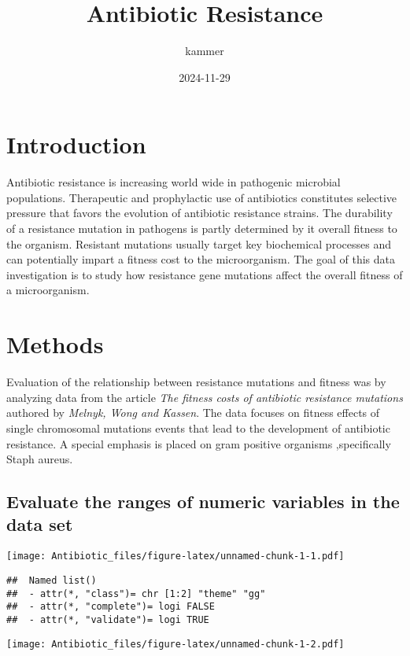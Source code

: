\documentclass[
]{article}
\title{Antibiotic Resistance}
\author{kammer}
\date{2024-11-29}
\begin{document}
\maketitle

\section{Introduction}\label{introduction}

Antibiotic resistance is increasing world wide in pathogenic microbial
populations. Therapeutic and prophylactic use of antibiotics constitutes
selective pressure that favors the evolution of antibiotic resistance
strains. The durability of a resistance mutation in pathogens is partly
determined by it overall fitness to the organism. Resistant mutations
usually target key biochemical processes and can potentially impart a
fitness cost to the microorganism. The goal of this data investigation
is to study how resistance gene mutations affect the overall fitness of
a microorganism.

\section{Methods}\label{methods}

Evaluation of the relationship between resistance mutations and fitness
was by analyzing data from the article \emph{The fitness costs of
antibiotic resistance mutations} authored by \emph{Melnyk, Wong and
Kassen}. The data focuses on fitness effects of single chromosomal
mutations events that lead to the development of antibiotic resistance.
A special emphasis is placed on gram positive organisms ,specifically
Staph aureus.

\subsection{Evaluate the ranges of numeric variables in the data
set}\label{evaluate-the-ranges-of-numeric-variables-in-the-data-set}

\texttt{[image: Antibiotic\_files/figure-latex/unnamed-chunk-1-1.pdf]}

\begin{verbatim}
##  Named list()
##  - attr(*, "class")= chr [1:2] "theme" "gg"
##  - attr(*, "complete")= logi FALSE
##  - attr(*, "validate")= logi TRUE
\end{verbatim}

\texttt{[image: Antibiotic\_files/figure-latex/unnamed-chunk-1-2.pdf]}
\end{document}
